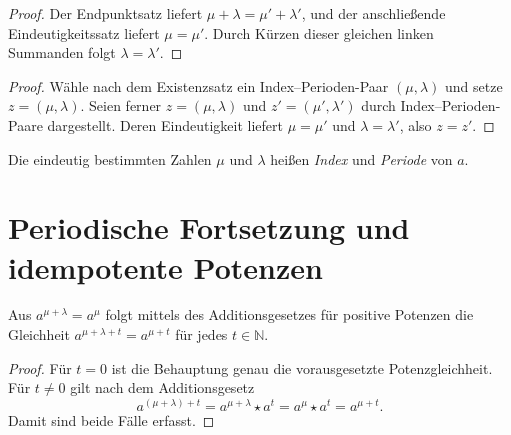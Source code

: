 \documentclass[main.tex]{subfiles}
\begin{document}
\begin{proof}
Der Endpunktsatz liefert
\(\mu+\lambda=\mu'+\lambda'\), und der anschließende Eindeutigkeitssatz
liefert \(\mu=\mu'\).  Durch Kürzen dieser gleichen linken Summanden folgt
\(\lambda=\lambda'\).
\end{proof}

\begin{proof}
Wähle nach dem Existenzsatz ein Index--Perioden-Paar
\((\mu,\lambda)\) und setze \(z=(\mu,\lambda)\).  Seien ferner
\(z=(\mu,\lambda)\) und \(z'=(\mu',\lambda')\) durch
Index--Perioden-Paare dargestellt.  Deren Eindeutigkeit liefert
\(\mu=\mu'\) und \(\lambda=\lambda'\), also \(z=z'\).
\end{proof}

Die eindeutig bestimmten Zahlen \(\mu\) und \(\lambda\) heißen
\emph{Index} und \emph{Periode} von \(a\).

\section{Periodische Fortsetzung und idempotente Potenzen}

Aus \(a^{\mu+\lambda}=a^\mu\) folgt mittels des Additionsgesetzes für
positive Potenzen die Gleichheit
\(a^{\mu+\lambda+t}=a^{\mu+t}\) für jedes \(t\in\mathbb N\).

\begin{proof}
Für \(t=0\) ist die Behauptung genau die vorausgesetzte Potenzgleichheit.
Für \(t\neq0\) gilt nach dem Additionsgesetz
\[
  a^{(\mu+\lambda)+t}
  =a^{\mu+\lambda}\star a^t
  =a^\mu\star a^t
  =a^{\mu+t}.
\]
Damit sind beide Fälle erfasst.
\end{proof}
\end{document}
